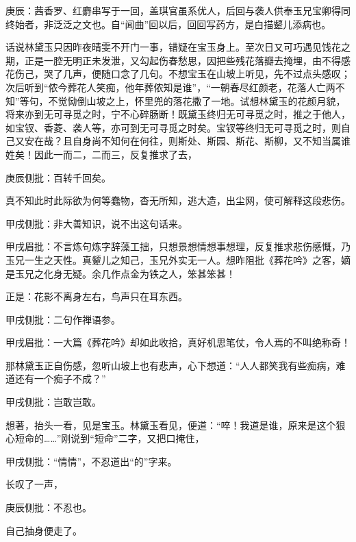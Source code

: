\begin{parag}
    \begin{note}庚辰：茜香罗、红麝串写于一回，盖琪官虽系优人，后回与袭人供奉玉兄宝卿得同终始者，非泛泛之文也。自“闻曲”回以后，回回写药方，是白描颦儿添病也。\end{note}
\end{parag}


\begin{parag}
    话说林黛玉只因昨夜晴雯不开门一事，错疑在宝玉身上。至次日又可巧遇见饯花之期，正是一腔无明正未发泄，又勾起伤春愁思，因把些残花落瓣去掩埋，由不得感花伤己，哭了几声，便随口念了几句。不想宝玉在山坡上听见，先不过点头感叹；次后听到“侬今葬花人笑痴，他年葬侬知是谁”，“一朝春尽红颜老，花落人亡两不知”等句，不觉恸倒山坡之上，怀里兜的落花撒了一地。试想林黛玉的花颜月貌，将来亦到无可寻觅之时，宁不心碎肠断！既黛玉终归无可寻觅之时，推之于他人，如宝钗、香菱、袭人等，亦可到无可寻觅之时矣。宝钗等终归无可寻觅之时，则自己又安在哉？且自身尚不知何在何往，则斯处、斯园、斯花、斯柳，又不知当属谁姓矣！因此一而二，二而三，反复推求了去，\begin{note}庚辰侧批：百转千回矣。\end{note}真不知此时此际欲为何等蠢物，杳无所知，逃大造，出尘网，使可解释这段悲伤。\begin{note}甲戌侧批：非大善知识，说不出这句话来。\end{note}\begin{note}甲戌眉批：不言炼句炼字辞藻工拙，只想景想情想事想理，反复推求悲伤感慨，乃玉兄一生之天性。真颦儿之知己，玉兄外实无一人。想昨阻批《葬花吟》之客，嫡是玉兄之化身无疑。余几作点金为铁之人，笨甚笨甚！\end{note}正是：花影不离身左右，鸟声只在耳东西。\begin{note}甲戌侧批：二句作禅语参。\end{note}\begin{note}甲戌眉批：一大篇《葬花吟》却如此收拾，真好机思笔仗，令人焉的不叫绝称奇！\end{note}
\end{parag}


\begin{parag}
    那林黛玉正自伤感，忽听山坡上也有悲声，心下想道：“人人都笑我有些痴病，难道还有一个痴子不成？”\begin{note}甲戌侧批：岂敢岂敢。\end{note}想著，抬头一看，见是宝玉。林黛玉看见，便道：“啐！我道是谁，原来是这个狠心短命的……”刚说到“短命”二字，又把口掩住，\begin{note}甲戌侧批：“情情”，不忍道出“的”字来。\end{note}长叹了一声，\begin{note}庚辰侧批：不忍也。\end{note}自己抽身便走了。
\end{parag}


